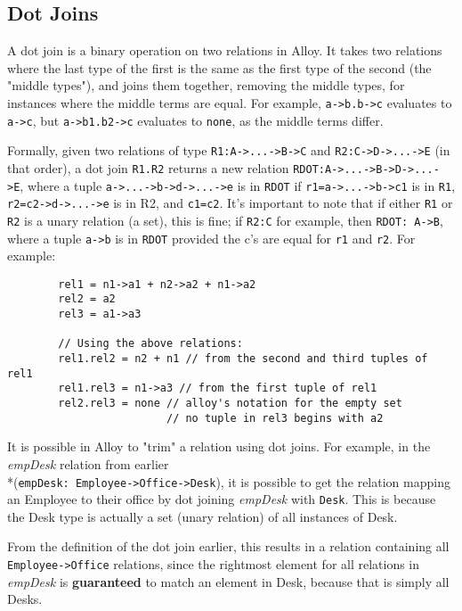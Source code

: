 \documentclass[10pt]{article}
\begin{document}
    \subsection*{Dot Joins}
      A dot join is a binary operation on two relations in Alloy. It takes two relations where the last type of the first is the same as the first type of the second (the "middle types"), and joins them together, removing the middle types, for instances where the middle terms are equal. For example, \lstinline|a->b.b->c| evaluates to \lstinline|a->c|, but \lstinline|a->b1.b2->c| evaluates to \lstinline|none|, as the middle terms differ.\par
      Formally, given two relations of type \lstinline|R1:A->...->B->C| and \lstinline|R2:C->D->...->E| (in that order), a dot join \lstinline|R1.R2| returns a new relation \lstinline|RDOT:A->...->B->D->...->E|, where a tuple \lstinline|a->...->b->d->...->e| is in \lstinline|RDOT| if \lstinline|r1=a->...->b->c1| is in \lstinline|R1|, \lstinline|r2=c2->d->...->e| is in R2, and \lstinline|c1=c2|. It's important to note that if either \lstinline|R1| or \lstinline|R2| is a unary relation (a set), this is fine; if \lstinline|R2:C| for example, then \lstinline|RDOT: A->B|, where a tuple \lstinline|a->b| is in \lstinline|RDOT| provided the c's are equal for \lstinline|r1| and \lstinline|r2|. For example:
      \begin{verbatim}
        rel1 = n1->a1 + n2->a2 + n1->a2
        rel2 = a2
        rel3 = a1->a3

        // Using the above relations:
        rel1.rel2 = n2 + n1 // from the second and third tuples of rel1
        rel1.rel3 = n1->a3 // from the first tuple of rel1
        rel2.rel3 = none // alloy's notation for the empty set
                         // no tuple in rel3 begins with a2
      \end{verbatim}
      It is possible in Alloy to "trim" a relation using dot joins. For example, in the \textit{empDesk} relation from earlier\\*(\lstinline|empDesk: Employee->Office->Desk|), it is possible to get the relation mapping an Employee to their office by dot joining \textit{empDesk} with \lstinline|Desk|. This is because the Desk type is actually a set (unary relation) of all instances of Desk.\par
      From the definition of the dot join earlier, this results in a relation containing all \lstinline|Employee->Office| relations, since the rightmost element for all relations in \textit{empDesk} is \textbf{guaranteed} to match an element in Desk, because that is simply all Desks.
\end{document}
